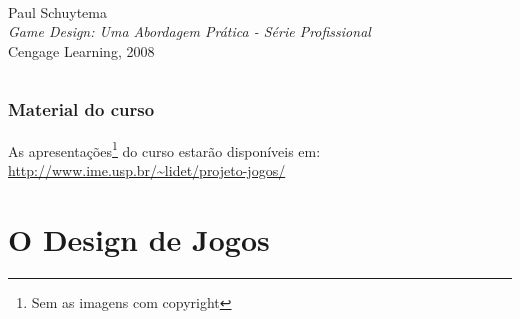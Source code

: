 \expandafter\documentclass\expandafter[table, usenames, svgnames, dvipsnames, \classopts]{beamer}
\begin{document}
\begin{frame}
\begin{columns}[c]
			\begin{center}
				\\
				Paul Schuytema\\[0.5em]
				\textit{{\large Game Design: Uma Abordagem Prática - Série Profissional}}\\[0.5em]
				{\small Cengage Learning, 2008}
			\end{center}
			
	\end{columns}
	
\end{frame}

\begin{frame} 
	\frametitle{\textbf{Material do curso}}
	
	\begin{center}
		{\large
			As apresentações\footnote{Sem as imagens com copyright} do curso estarão disponíveis em:\\[1em]
			\url{http://www.ime.usp.br/~lidet/projeto-jogos/}
		}
	\end{center}
	
\end{frame}

\section{O Design de Jogos}
\end{document}
